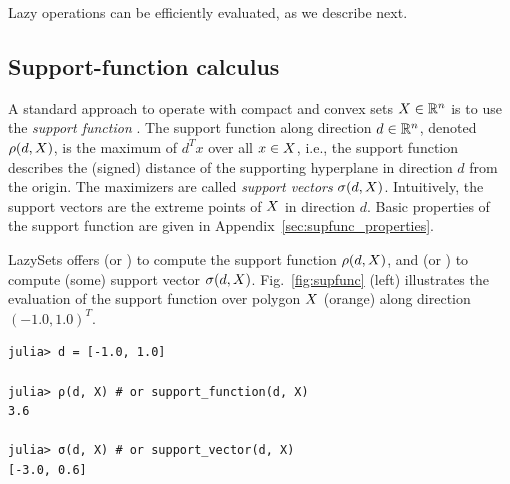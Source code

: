 \smallskip

Lazy operations can be efficiently evaluated, as we describe next.


\subsection{Support-function calculus} \label{sec:supfun}

A standard approach to operate with compact and convex sets $X \in \mathbb{R}^n$ is to use the \emph{support function} \cite{LeGuernic09}.
%
The support function along direction $d \in \mathbb{R}^n$, denoted $\rho(d, X)$, is the maximum of $d^T x$ over all $x \in X$, i.e., the support function describes the (signed) distance of the supporting hyperplane in direction $d$ from the origin.
%
The maximizers are called \emph{support vectors} $\sigma(d, X)$. Intuitively, the support vectors are the extreme points of $X$ in direction $d$.
%
Basic properties of the support function are given in Appendix~\ref{sec:supfunc_properties}.

\smallskip

LazySets offers  (or ) to compute the support function $\rho(d,X)$, and  (or ) to compute (some) support vector $\sigma(d,X)$. Fig.~\ref{fig:supfunc} (left) illustrates the evaluation of the support function over polygon $X$ (orange) along direction $(-1.0, 1.0)^T$.

\begin{minipage}{\linewidth}
\begin{lstlisting}
julia> d = [-1.0, 1.0]

julia> ρ(d, X) # or support_function(d, X)
3.6

julia> σ(d, X) # or support_vector(d, X)
[-3.0, 0.6]
\end{lstlisting}
\end{minipage}

